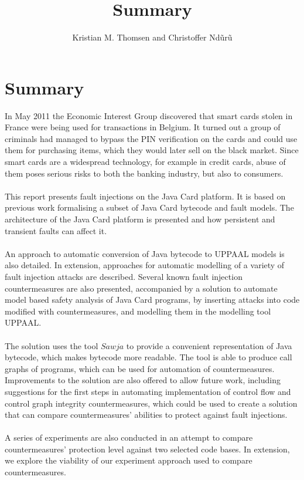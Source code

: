 \documentclass{article}
\begin{document}
\title{Summary}
\author{Kristian M. Thomsen and Christoffer Nd\~ur\~u}
\maketitle

\section{Summary}
In May 2011 the Economic Interest Group discovered that smart cards stolen in France were being used for transactions in Belgium. It turned out a group of criminals had managed to bypass the PIN verification on the cards and could use them for purchasing items, which they would later sell on the black market. Since smart cards are a widespread technology, for example in credit cards, abuse of them poses serious risks to both the banking industry, but also to consumers.\\\\
This report presents fault injections on the Java Card platform. It is based on previous work formalising a subset of Java Card bytecode and fault models. The architecture of the Java Card platform is presented and how persistent and transient faults can affect it.\\\\
An approach to automatic conversion of Java bytecode to UPPAAL models is also detailed. In extension, approaches for automatic modelling of a variety of fault injection attacks are described.
Several known fault injection countermeasures are also presented, accompanied by a solution to automate model based safety analysis of Java Card programs, by inserting attacks into code modified with countermeasures, and modelling them in the modelling tool UPPAAL.\\\\
The solution uses the tool $Sawja$ to provide a convenient representation of Java bytecode, which makes bytecode more readable. The tool is able to produce call graphs of programs, which can be used for automation of countermeasures. Improvements to the solution are also offered to allow future work, including suggestions for the first steps in automating implementation of control flow and control graph integrity countermeasures, which could be used to create a solution that can compare countermeasures' abilities to protect against fault injections.\\\\
A series of experiments are also conducted in an attempt to compare countermeasures' protection level against two selected code bases. In extension, we explore the viability of our experiment approach used to compare countermeasures.
\end{document}
